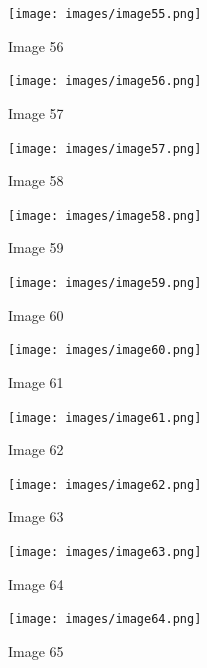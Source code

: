\documentclass{article}%
\begin{document}
%


\begin{figure}[h!]%
\centering%
\texttt{[image: images/image55.png]}%
\caption{Image 56}%
\end{figure}

%


\begin{figure}[h!]%
\centering%
\texttt{[image: images/image56.png]}%
\caption{Image 57}%
\end{figure}

%


\begin{figure}[h!]%
\centering%
\texttt{[image: images/image57.png]}%
\caption{Image 58}%
\end{figure}

%


\begin{figure}[h!]%
\centering%
\texttt{[image: images/image58.png]}%
\caption{Image 59}%
\end{figure}

%


\begin{figure}[h!]%
\centering%
\texttt{[image: images/image59.png]}%
\caption{Image 60}%
\end{figure}

%


\begin{figure}[h!]%
\centering%
\texttt{[image: images/image60.png]}%
\caption{Image 61}%
\end{figure}

%


\begin{figure}[h!]%
\centering%
\texttt{[image: images/image61.png]}%
\caption{Image 62}%
\end{figure}

%


\begin{figure}[h!]%
\centering%
\texttt{[image: images/image62.png]}%
\caption{Image 63}%
\end{figure}

%


\begin{figure}[h!]%
\centering%
\texttt{[image: images/image63.png]}%
\caption{Image 64}%
\end{figure}

%


\begin{figure}[h!]%
\centering%
\texttt{[image: images/image64.png]}%
\caption{Image 65}%
\end{figure}
\end{document}
